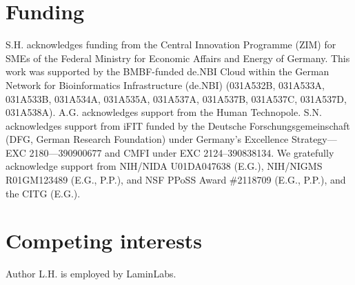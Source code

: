 \documentclass{bioinfo}
\theoremstyle{definition}
\begin{document}
	\vspace{-0.6cm}
	
	\section*{Funding}
	
	 S.H. acknowledges funding from the Central Innovation Programme (ZIM) for SMEs of the Federal Ministry for Economic Affairs and Energy of Germany. This work was supported by the BMBF-funded de.NBI Cloud within the German Network for Bioinformatics Infrastructure (de.NBI) (031A532B, 031A533A, 031A533B, 031A534A, 031A535A, 031A537A, 031A537B, 031A537C, 031A537D, 031A538A). A.G. acknowledges support from the Human Technopole. S.N. acknowledges support from iFIT funded by the Deutsche Forschungsgemeinschaft (DFG, German Research Foundation) under Germany’s Excellence Strategy—EXC 2180—390900677 and CMFI under EXC 2124–390838134. 
     We gratefully acknowledge support from NIH/NIDA U01DA047638 (E.G.), NIH/NIGMS R01GM123489 (E.G., P.P.), and NSF PPoSS Award \#2118709 (E.G., P.P.), and the CITG (E.G.).
	 
	\vspace{-0.6cm}
	
	\section*{Competing interests}
	Author L.H. is employed by LaminLabs.
	
	\vspace{-0.6cm}
	
%	
		
\end{document}
